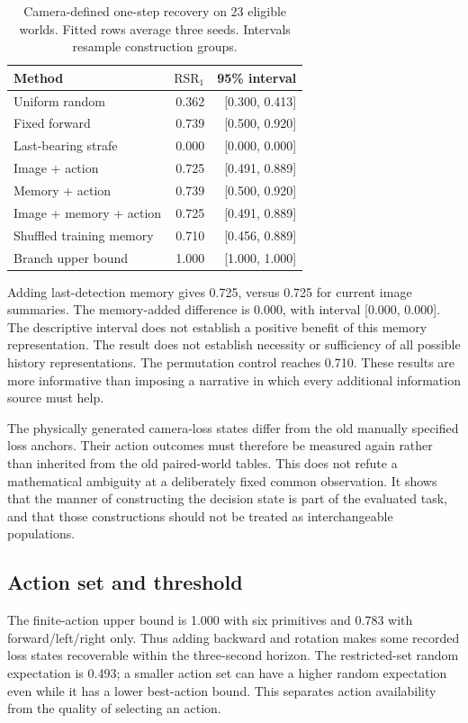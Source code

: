 \documentclass[10pt,twocolumn,a4paper]{article}
\begin{document}
\begin{table}[t]
\centering\small
\caption{Camera-defined one-step recovery on 23 eligible worlds. Fitted rows average three seeds. Intervals resample construction groups.}
\begin{tabular}{lrr}\toprule Method & $\mathrm{RSR}_1$ & 95\% interval\\\midrule
Uniform random & 0.362 & [0.300, 0.413]\\
Fixed forward & 0.739 & [0.500, 0.920]\\
Last-bearing strafe & 0.000 & [0.000, 0.000]\\
Image + action & 0.725 & [0.491, 0.889]\\
Memory + action & 0.739 & [0.500, 0.920]\\
Image + memory + action & 0.725 & [0.491, 0.889]\\
Shuffled training memory & 0.710 & [0.456, 0.889]\\
Branch upper bound & 1.000 & [1.000, 1.000]\\
\bottomrule\end{tabular}\label{tab:camera}
\end{table}

Adding last-detection memory gives 0.725, versus 0.725 for current image summaries. The memory-added difference is 0.000, with interval [0.000, 0.000]. The descriptive interval does not establish a positive benefit of this memory representation. The result does not establish necessity or sufficiency of all possible history representations. The permutation control reaches 0.710. These results are more informative than imposing a narrative in which every additional information source must help.

The physically generated camera-loss states differ from the old manually specified loss anchors. Their action outcomes must therefore be measured again rather than inherited from the old paired-world tables. This does not refute a mathematical ambiguity at a deliberately fixed common observation. It shows that the manner of constructing the decision state is part of the evaluated task, and that those constructions should not be treated as interchangeable populations.

\subsection{Action set and threshold}
The finite-action upper bound is 1.000 with six primitives and 0.783 with forward/left/right only. Thus adding backward and rotation makes some recorded loss states recoverable within the three-second horizon. The restricted-set random expectation is 0.493; a smaller action set can have a higher random expectation even while it has a lower best-action bound. This separates action availability from the quality of selecting an action.
\end{document}
